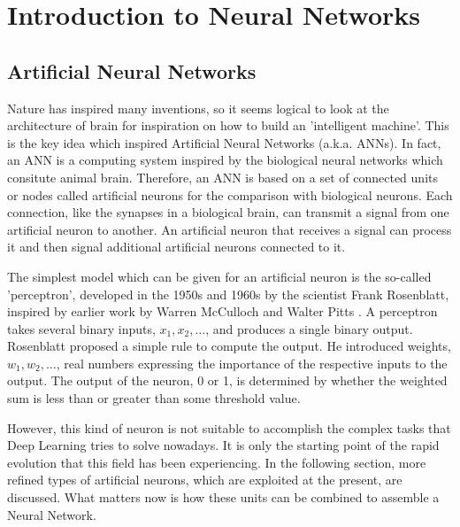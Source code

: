 \chapter{Introduction to Neural Networks}
\label{chap:NN}





\section{Artificial Neural Networks}
Nature has inspired many inventions, so it seems logical to look at the architecture of brain for inspiration on how to build an 'intelligent machine'. This is the key idea which inspired Artificial Neural Networks (a.k.a. ANNs). In fact, an ANN is a computing system inspired by the biological neural networks which consitute animal brain. Therefore, an ANN is based on a set of connected units or nodes called artificial neurons for the comparison with biological neurons. Each connection, like the synapses in a biological brain, can transmit a signal from one artificial neuron to another. An artificial neuron that receives a signal can process it and then signal additional artificial neurons connected to it.

The simplest model which can be given for an artificial neuron is the so-called 'perceptron', developed in the 1950s and 1960s by the scientist Frank Rosenblatt, inspired by earlier work by Warren McCulloch and Walter Pitts \cite{nielsen}. A perceptron takes several binary inputs, $x_{1}, x_{2}, \dots$, and produces a single binary output. Rosenblatt proposed a simple rule to compute the output. He introduced weights, $w_{1},w_{2},\dots$, real numbers expressing the importance of the respective inputs to the output. The output of the neuron, 0 or 1, is determined by whether the weighted sum is less than or greater than some threshold value.

\begin{figure}[H]
	\centering
	
	\label{fig:PERCEPTRON}
\end{figure}

However, this kind of neuron is not suitable to accomplish the complex tasks that Deep Learning tries to solve nowadays. It is only the starting point of the rapid evolution that this field has been experiencing. In the following section, more refined types of artificial neurons, which are exploited at the present, are discussed. What matters now is how these units can be combined to assemble a Neural Network.

